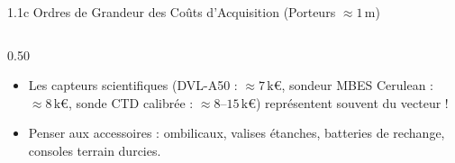 \begin{frame}{1.1c Ordres de Grandeur des Coûts d'Acquisition (Porteurs $\approx 1\,\text{m}$)}
\begin{columns}[T]
    \begin{column}{0.50\textwidth}
      \begin{block}{}
        \begin{itemize}
          \item Les capteurs scientifiques (DVL-A50 : $\approx 7\,\text{k€}$, sondeur MBES Cerulean : $\approx 8\,\text{k€}$, sonde CTD calibrée : $\approx 8\text{--}15\,\text{k€}$) représentent souvent  du vecteur !
          \item Penser aux accessoires : ombilicaux, valises étanches, batteries de rechange, consoles terrain durcies.
        \end{itemize}
      \end{block}
    \end{column}
  \end{columns}
\end{frame}

